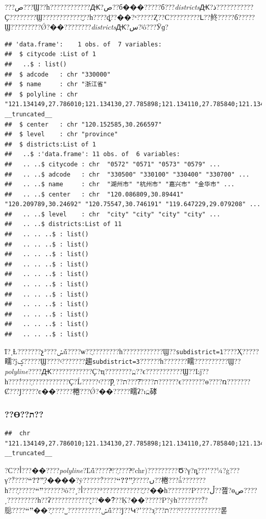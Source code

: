 \documentclass[]{article}
\begin{document}
???ص???Ϣ??һ????????????Ԫ?ص??б���?????б???\emph{districts}Ԫ?ذ???????????Ҫ????????Ϣ????????????ֱ??һ????ȡ??��?ˣ?????Ȥ??С?????????Լ??鿴?????б?????Ϣ?????????Ǿ?��????????\emph{districts}Ԫ?س?ʲô???Ӱɡ?

\begin{verbatim}
## 'data.frame':    1 obs. of  7 variables:
##  $ citycode :List of 1
##   ..$ : list()
##  $ adcode   : chr "330000"
##  $ name     : chr "浙江省"
##  $ polyline : chr "121.134149,27.786010;121.134130,27.785898;121.134110,27.785840;121.134079,27.785817;121.134009,27.785782;121.13"| __truncated__
##  $ center   : chr "120.152585,30.266597"
##  $ level    : chr "province"
##  $ districts:List of 1
##   ..$ :'data.frame': 11 obs. of  6 variables:
##   .. ..$ citycode : chr  "0572" "0571" "0573" "0579" ...
##   .. ..$ adcode   : chr  "330500" "330100" "330400" "330700" ...
##   .. ..$ name     : chr  "湖州市" "杭州市" "嘉兴市" "金华市" ...
##   .. ..$ center   : chr  "120.086809,30.89441" "120.209789,30.24692" "120.75547,30.746191" "119.647229,29.079208" ...
##   .. ..$ level    : chr  "city" "city" "city" "city" ...
##   .. ..$ districts:List of 11
##   .. .. ..$ : list()
##   .. .. ..$ : list()
##   .. .. ..$ : list()
##   .. .. ..$ : list()
##   .. .. ..$ : list()
##   .. .. ..$ : list()
##   .. .. ..$ : list()
##   .. .. ..$ : list()
##   .. .. ..$ : list()
##   .. .. ..$ : list()
##   .. .. ..$ : list()
\end{verbatim}

Ϊ?˱Ƚ???????չʾ???ݽṹ????ѡ??ֻ????????һ????????????Ϣ??\texttt{subdistrict=1}????Ҳ?????㽭?ĵؼ?????Ϣ????ʵ???????趨\texttt{subdistrict=3}??????һ???????㽭??????????Ϣ??
\emph{polyline}????Ԫ????????????Ҫ?ҵ????????߽??ϵ???????????Ϣ??Ŀǰ??һ???ܳ????ַ???????????Ҫ?Ĺ?????ʵ???Ƿָ??ת?????͡???ת??????ϵ???????ɵ????ռ???????Ȼ???Ϳ?????ͼ��?????棬???Ǿ?��?????㽭ʡ?ı߽硣

\subsubsection{??ϴ??ת??}

\begin{verbatim}
##  chr "121.134149,27.786010;121.134130,27.785898;121.134110,27.785840;121.134079,27.785817;121.134009,27.785782;121.13"| __truncated__
\end{verbatim}

?Ϲ??أ???��????\emph{polyline}?Ľṹ?????ͣ??ַ????ͣ?chr)?????????Ծ?γ?ȵ???ʽ??¼?ģ???γ??֮????\textbf{``??''}?ָ����?ÿ??????֮????\textbf{``??''}?ָ????ں??棬???ǻ???????һ???ָ?????\textbf{``\textbar{}''}??????ʲô??˼?أ?????ʾ????????????ֻ??��һ???????Ρ????ڵ??졢?ɵص????͵?????????һ??ʡ???????????ܻ???��?ܶ??Ķ?��?????Ρ?ÿһ????????֮?䶼????\textbf{``\textbar{}''}��?ָ????˽??????????ݽṹ???Ϳ??Կ?ʼ???зָ???ת???ˡ????????????롣
\end{document}
